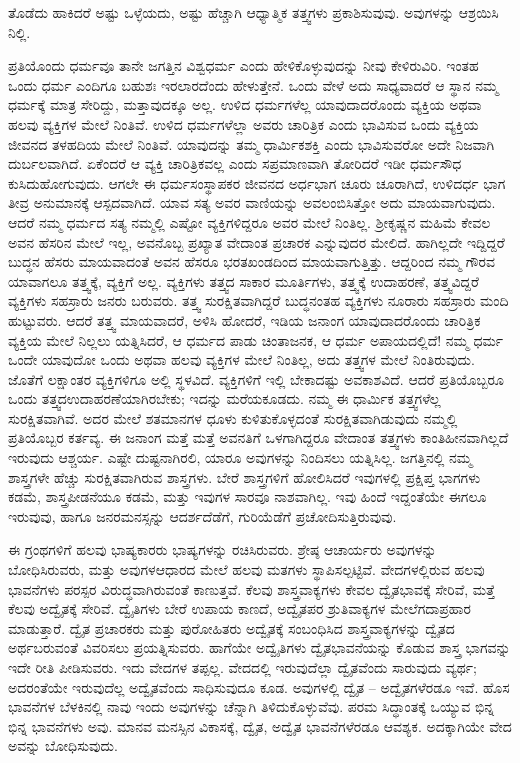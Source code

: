 ತೊಡೆದು ಹಾಕಿದರೆ ಅಷ್ಟು ಒಳ್ಳೆಯದು, ಅಷ್ಟು ಹೆಚ್ಚಾಗಿ ಆಧ್ಯಾತ್ಮಿಕ ತತ್ತ್ವಗಳು ಪ್ರಕಾಶಿಸುವುವು. ಅವುಗಳನ್ನು ಆಶ್ರಯಿಸಿ ನಿಲ್ಲಿ.

ಪ್ರತಿಯೊಂದು ಧರ್ಮವೂ ತಾನೇ ಜಗತ್ತಿನ ವಿಶ್ವಧರ್ಮ ಎಂದು ಹೇಳಿಕೊಳ್ಳುವುದನ್ನು ನೀವು ಕೇಳಿರುವಿರಿ. ಇಂತಹ ಒಂದು ಧರ್ಮ ಎಂದಿಗೂ ಬಹುಶಃ ಇರಲಾರದೆಂದು ಹೇಳುತ್ತೇನೆ. ಒಂದು ವೇಳೆ ಅದು ಸಾಧ್ಯವಾದರೆ ಆ ಸ್ಥಾನ ನಮ್ಮ ಧರ್ಮಕ್ಕೆ ಮಾತ್ರ ಸೇರಿದ್ದು, ಮತ್ತಾವುದಕ್ಕೂ ಅಲ್ಲ. ಉಳಿದ ಧರ್ಮಗಳೆಲ್ಲ ಯಾವುದಾದರೊಂದು ವ್ಯಕ್ತಿಯ ಅಥವಾ ಹಲವು ವ್ಯಕ್ತಿಗಳ ಮೇಲೆ ನಿಂತಿವೆ. ಉಳಿದ ಧರ್ಮಗಳೆಲ್ಲಾ ಅವರು ಚಾರಿತ್ರಿಕ ಎಂದು ಭಾವಿಸುವ ಒಂದು ವ್ಯಕ್ತಿಯ ಜೀವನದ ತಳಹದಿಯ ಮೇಲೆ ನಿಂತಿವೆ. ಯಾವುದನ್ನು ತಮ್ಮ ಧಾರ್ಮಿಕಶಕ್ತಿ ಎಂದು ಭಾವಿಸುವರೋ ಅದೇ ನಿಜವಾಗಿ ದುರ್ಬಲವಾಗಿದೆ. ಏಕೆಂದರೆ ಆ ವ್ಯಕ್ತಿ ಚಾರಿತ್ರಿಕವಲ್ಲ ಎಂದು ಸಪ್ರಮಾಣವಾಗಿ ತೋರಿದರೆ ಇಡೀ ಧರ್ಮಸೌಧ ಕುಸಿದುಹೋಗುವುದು. ಆಗಲೇ ಈ ಧರ್ಮಸಂಸ್ಥಾಪಕರ ಜೀವನದ ಅರ್ಧಭಾಗ ಚೂರು ಚೂರಾಗಿದೆ, ಉಳಿದರ್ಧ ಭಾಗ ತೀವ್ರ ಅನುಮಾನಕ್ಕೆ ಆಸ್ಪದವಾಗಿದೆ. ಯಾವ ಸತ್ಯ ಅವರ ವಾಣಿಯನ್ನು ಅವಲಂಬಿಸಿತ್ತೋ ಅದು ಮಾಯವಾಗುವುದು. ಆದರೆ ನಮ್ಮ ಧರ್ಮದ ಸತ್ಯ ನಮ್ಮಲ್ಲಿ ಎಷ್ಟೋ ವ್ಯಕ್ತಿಗಳಿದ್ದರೂ ಅವರ ಮೇಲೆ ನಿಂತಿಲ್ಲ. ಶ‍್ರೀಕೃಷ್ಣನ ಮಹಿಮೆ ಕೇವಲ ಅವನ ಹೆಸರಿನ ಮೇಲೆ ಇಲ್ಲ, ಅವನೊಬ್ಬ ಪ್ರಖ್ಯಾತ ವೇದಾಂತ ಪ್ರಚಾರಕ ಎನ್ನುವುದರ ಮೇಲಿದೆ. ಹಾಗಿಲ್ಲದೇ ಇದ್ದಿದ್ದರೆ ಬುದ್ಧನ ಹೆಸರು ಮಾಯವಾದಂತೆ ಅವನ ಹೆಸರೂ ಭರತಖಂಡದಿಂದ ಮಾಯವಾಗುತ್ತಿತ್ತು. ಆದ್ದರಿಂದ ನಮ್ಮ ಗೌರವ ಯಾವಾಗಲೂ ತತ್ತ್ವಕ್ಕೆ, ವ್ಯಕ್ತಿಗೆ ಅಲ್ಲ. ವ್ಯಕ್ತಿಗಳು ತತ್ತ್ವದ ಸಾಕಾರ ಮೂರ್ತಿಗಳು, ತತ್ತ್ವಕ್ಕೆ ಉದಾಹರಣೆ, ತತ್ತ್ವವಿದ್ದರೆ ವ್ಯಕ್ತಿಗಳು ಸಹಸ್ರಾರು ಜನರು ಬರುವರು. ತತ್ತ್ವ ಸುರಕ್ಷಿತವಾಗಿದ್ದರೆ ಬುದ್ಧನಂತಹ ವ್ಯಕ್ತಿಗಳು ನೂರಾರು ಸಹಸ್ರಾರು ಮಂದಿ ಹುಟ್ಟುವರು. ಆದರೆ ತತ್ತ್ವ ಮಾಯವಾದರೆ, ಅಳಿಸಿ ಹೋದರೆ, ಇಡಿಯ ಜನಾಂಗ ಯಾವುದಾದರೊಂದು ಚಾರಿತ್ರಿಕ ವ್ಯಕ್ತಿಯ ಮೇಲೆ ನಿಲ್ಲಲು ಯತ್ನಿಸಿದರೆ, ಆ ಧರ್ಮದ ಪಾಡು ಚಿಂತಾಜನಕ, ಆ ಧರ್ಮ ಅಪಾಯದಲ್ಲಿದೆ! ನಮ್ಮ ಧರ್ಮ ಒಂದೇ ಯಾವುದೋ ಒಂದು ಅಥವಾ ಹಲವು ವ್ಯಕ್ತಿಗಳ ಮೇಲೆ ನಿಂತಿಲ್ಲ, ಅದು ತತ್ತ್ವಗಳ ಮೇಲೆ ನಿಂತಿರುವುದು. ಜೊತೆಗೆ ಲಕ್ಷಾಂತರ ವ್ಯಕ್ತಿಗಳಿಗೂ ಅಲ್ಲಿ ಸ್ಥಳವಿದೆ. ವ್ಯಕ್ತಿಗಳಿಗೆ ಇಲ್ಲಿ ಬೇಕಾದಷ್ಟು ಅವಕಾಶವಿದೆ. ಆದರೆ ಪ್ರತಿಯೊಬ್ಬರೂ ಒಂದು ತತ್ತ್ವದ\break ಉದಾಹರಣೆಯಾಗಿರಬೇಕು; ಇದನ್ನು ಮರೆಯಕೂಡದು. ನಮ್ಮ ಈ ಧಾರ್ಮಿಕ ತತ್ತ್ವಗಳೆಲ್ಲ ಸುರಕ್ಷಿತವಾಗಿವೆ. ಅದರ ಮೇಲೆ ಶತಮಾನಗಳ ಧೂಳು ಕುಳಿತು\-ಕೊಳ್ಳದಂತೆ ಸುರಕ್ಷಿತವಾಗಿಡುವುದು ನಮ್ಮಲ್ಲಿ ಪ್ರತಿಯೊಬ್ಬರ ಕರ್ತವ್ಯ. ಈ ಜನಾಂಗ ಮತ್ತೆ ಮತ್ತೆ ಅವನತಿಗೆ ಒಳಗಾಗಿದ್ದರೂ ವೇದಾಂತ ತತ್ತ್ವಗಳು ಕಾಂತಿಹೀನವಾಗಿಲ್ಲದೆ ಇರುವುದು ಆಶ್ಚರ್ಯ. ಎಷ್ಟೇ ದುಷ್ಟನಾಗಿರಲಿ, ಯಾರೂ ಅವುಗಳನ್ನು ನಿಂದಿಸಲು ಯತ್ನಿಸಿಲ್ಲ. ಜಗತ್ತಿನಲ್ಲಿ ನಮ್ಮ ಶಾಸ್ತ್ರಗಳೇ ಹೆಚ್ಚು ಸುರಕ್ಷಿತವಾಗಿರುವ ಶಾಸ್ತ್ರಗಳು. ಬೇರೆ ಶಾಸ್ತ್ರಗಳಿಗೆ ಹೋಲಿಸಿದರೆ ಇವುಗಳಲ್ಲಿ ಪ್ರಕ್ಷಿಪ್ತ ಭಾಗಗಳು ಕಡಮೆ, ಶಾಸ್ತ್ರಪೀಡನೆಯೂ ಕಡಮೆ, ಮತ್ತು ಇವುಗಳ ಸಾರವೂ ನಾಶವಾಗಿಲ್ಲ. ಇವು ಹಿಂದೆ ಇದ್ದಂತೆಯೇ ಈಗಲೂ ಇರುವುವು, ಹಾಗೂ ಜನರ\break ಮನಸ್ಸನ್ನು ಆದರ್ಶದೆಡೆಗೆ, ಗುರಿಯೆಡೆಗೆ ಪ್ರಚೋದಿಸುತ್ತಿರುವುವು.

ಈ ಗ್ರಂಥಗಳಿಗೆ ಹಲವು ಭಾಷ್ಯಕಾರರು ಭಾಷ್ಯಗಳನ್ನು ರಚಿಸಿರುವರು. ಶ್ರೇಷ್ಠ ಆಚಾರ್ಯರು ಅವುಗಳನ್ನು ಬೋಧಿಸಿರುವರು, ಮತ್ತು ಅವುಗಳ\break ಆಧಾರದ ಮೇಲೆ ಹಲವು ಮತಗಳು ಸ್ಥಾಪಿಸಲ್ಪಟ್ಟಿವೆ. ವೇದಗಳಲ್ಲಿರುವ ಹಲವು ಭಾವನೆಗಳು ಪರಸ್ಪರ ವಿರುದ್ಧವಾಗಿರುವಂತೆ ಕಾಣುತ್ತವೆ. ಕೆಲವು ಶಾಸ್ತ್ರವಾಕ್ಯಗಳು ಕೇವಲ ದ್ವೈತಭಾವಕ್ಕೆ ಸೇರಿವೆ, ಮತ್ತೆ ಕೆಲವು ಅದ್ವೈತಕ್ಕೆ ಸೇರಿವೆ. ದ್ವೈತಿಗಳು ಬೇರೆ ಉಪಾಯ ಕಾಣದೆ, ಅದ್ವೈತಪರ ಶ್ರುತಿವಾಕ್ಯಗಳ ಮೇಲೆ\break ಗದಾಪ್ರಹಾರ ಮಾಡುತ್ತಾರೆ. ದ್ವೈತ ಪ್ರಚಾರಕರು ಮತ್ತು ಪುರೋಹಿತರು ಅದ್ವೈತಕ್ಕೆ ಸಂಬಂಧಿಸಿದ ಶಾಸ್ತ್ರವಾಕ್ಯಗಳನ್ನು ದ್ವೈತದ ಅರ್ಥಬರುವಂತೆ ವಿವರಿಸಲು ಪ್ರಯತ್ನಿಸುವರು. ಹಾಗೆಯೇ ಅದ್ವೈತಿಗಳು ದ್ವೈತಭಾವನೆಯನ್ನು ಕೊಡುವ ಶಾಸ್ತ್ರ ಭಾಗವನ್ನು ಇದೇ ರೀತಿ ಪೀಡಿಸುವರು. ಇದು ವೇದಗಳ ತಪ್ಪಲ್ಲ. ವೇದದಲ್ಲಿ ಇರುವುದೆಲ್ಲಾ ದ್ವೈತವೆಂದು ಸಾರುವುದು ವ್ಯರ್ಥ; ಅದರಂತೆಯೇ ಇರುವುದೆಲ್ಲ ಅದ್ವೈತವೆಂದು ಸಾಧಿಸುವುದೂ ಕೂಡ. ಅವುಗಳಲ್ಲಿ ದ್ವೈತ – ಅದ್ವೈತಗಳೆರಡೂ ಇವೆ. ಹೊಸ ಭಾವನೆಗಳ ಬೆಳಕಿನಲ್ಲಿ ನಾವು ಇಂದು ಅವುಗಳನ್ನು ಚೆನ್ನಾಗಿ ತಿಳಿದುಕೊಳ್ಳುವೆವು. ಪರಮ ಸಿದ್ಧಾಂತಕ್ಕೆ ಒಯ್ಯುವ ಭಿನ್ನ ಭಿನ್ನ ಭಾವನೆಗಳು ಅವು. ಮಾನವ ಮನಸ್ಸಿನ ವಿಕಾಸಕ್ಕೆ, ದ್ವೈತ, ಅದ್ವೈತ ಭಾವನೆ\-ಗಳೆರಡೂ ಆವಶ್ಯಕ. ಅದಕ್ಕಾಗಿಯೇ ವೇದ ಅವನ್ನು ಬೋಧಿಸುವುದು.

